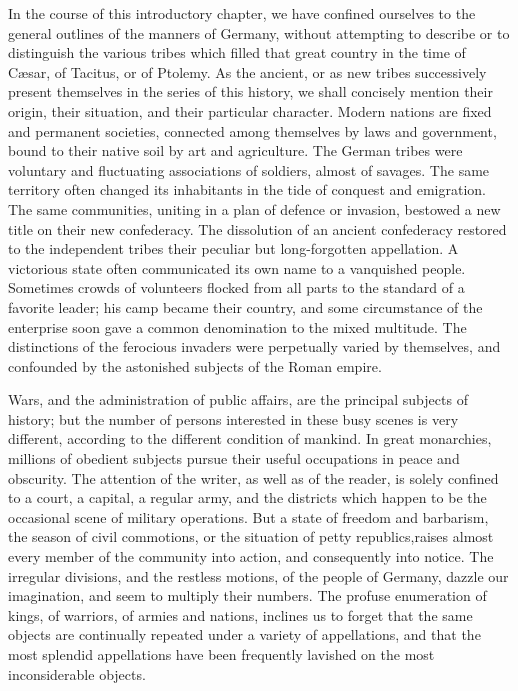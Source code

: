 
In the course of this introductory chapter, we have confined
ourselves to the general outlines of the manners of Germany,
without attempting to describe or to distinguish the various
tribes which filled that great country in the time of Cæsar, of
Tacitus, or of Ptolemy. As the ancient, or as new tribes
successively present themselves in the series of this history, we
shall concisely mention their origin, their situation, and their
particular character. Modern nations are fixed and permanent
societies, connected among themselves by laws and government,
bound to their native soil by art and agriculture. The German
tribes were voluntary and fluctuating associations of soldiers,
almost of savages. The same territory often changed its
inhabitants in the tide of conquest and emigration. The same
communities, uniting in a plan of defence or invasion, bestowed a
new title on their new confederacy. The dissolution of an ancient
confederacy restored to the independent tribes their peculiar but
long-forgotten appellation. A victorious state often communicated
its own name to a vanquished people. Sometimes crowds of
volunteers flocked from all parts to the standard of a favorite
leader; his camp became their country, and some circumstance of
the enterprise soon gave a common denomination to the mixed
multitude. The distinctions of the ferocious invaders were
perpetually varied by themselves, and confounded by the
astonished subjects of the Roman empire.\footnotemark[86]


Wars, and the administration of public affairs, are the principal
subjects of history; but the number of persons interested in
these busy scenes is very different, according to the different
condition of mankind. In great monarchies, millions of obedient
subjects pursue their useful occupations in peace and obscurity.
The attention of the writer, as well as of the reader, is solely
confined to a court, a capital, a regular army, and the districts
which happen to be the occasional scene of military operations.
But a state of freedom and barbarism, the season of civil
commotions, or the situation of petty republics,\footnotemark[87] raises almost
every member of the community into action, and consequently into
notice. The irregular divisions, and the restless motions, of the
people of Germany, dazzle our imagination, and seem to multiply
their numbers. The profuse enumeration of kings, of warriors, of
armies and nations, inclines us to forget that the same objects
are continually repeated under a variety of appellations, and
that the most splendid appellations have been frequently lavished
on the most inconsiderable objects.

